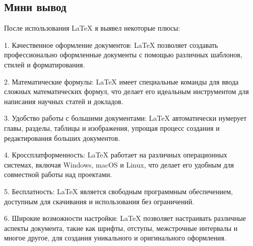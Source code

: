 \subsection{Мини вывод}

После использования LaTeX я выявел некоторые плюсы:

1. Качественное оформление документов: LaTeX позволяет создавать профессионально оформленные документы с помощью различных шаблонов, стилей и форматирования.

2. Математические формулы: LaTeX имеет специальные команды для ввода сложных математических формул, что делает его идеальным инструментом для написания научных статей и докладов.

3. Удобство работы с большими документами: LaTeX автоматически нумерует главы, разделы, таблицы и изображения, упрощая процесс создания и редактирования больших документов.

4. Кроссплатформенность: LaTeX работает на различных операционных системах, включая Windows, macOS и Linux, что делает его удобным для совместной работы над проектами.

5. Бесплатность: LaTeX является свободным программным обеспечением, доступным для скачивания и использования без ограничений.

6. Широкие возможности настройки: LaTeX позволяет настраивать различные аспекты документа, такие как шрифты, отступы, межстрочные интервалы и многое другое, для создания уникального и оригинального оформления.

